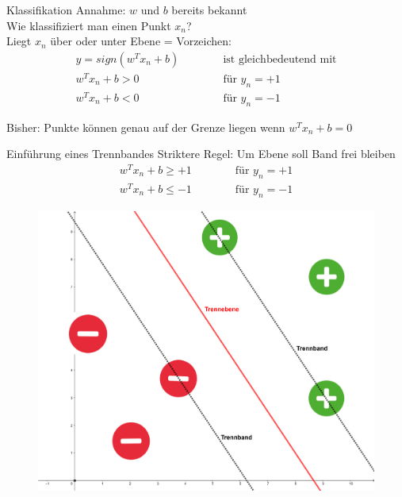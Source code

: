 \documentclass[ngerman]{beamer}
\begin{document}
\begin{frame}{Klassifikation}
	Annahme: $w$ und $b$ bereits bekannt\\
	Wie klassifiziert man einen Punkt $x_{n}$? \\ \pause
	Liegt $x_{n}$ über oder unter Ebene = Vorzeichen:
	\begin{subequations}
		\begin{alignat*}{2}
			y = sign(w^{T} x_{n} + b)  & \qquad & \text{ ist gleichbedeutend mit} \\
			w^{T} x_{n} + b > 0 & & \text{ für } y_{n} = +1\\
			w^{T} x_{n} + b < 0 & & \text{ für } y_{n} = -1
		\end{alignat*}
	\end{subequations}

	Bisher: Punkte können genau auf der Grenze liegen wenn $w^{T} x_{n} + b = 0$ \\
\end{frame}



\begin{frame}{Einführung eines Trennbandes}	
	Striktere Regel: Um Ebene soll Band frei bleiben \\
	\begin{subequations} \label{decision_rules}
		\begin{alignat*}{2}
			w^{T} x_{n} + b \geq +1 & \qquad & \text{ für } y_{n} = +1\\
			w^{T} x_{n} + b \leq -1 & & \text{ für } y_{n} = -1
		\end{alignat*}
	\end{subequations}

	\begin{center}
		\begin{figure}
			\includegraphics[width=\textwidth,height=0.6\textheight,keepaspectratio]{assets/trennband.png}
		\end{figure}
	\end{center}

\end{frame}
\end{document}
